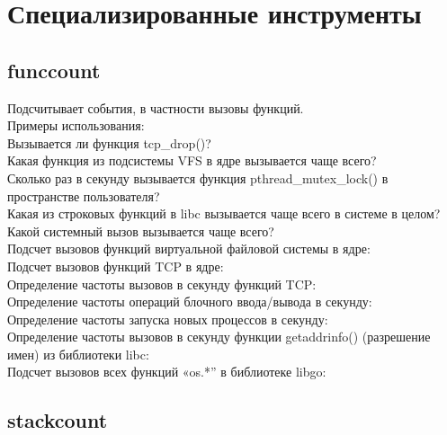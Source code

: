 \section{Специализированные инструменты}

\subsection{funccount}
Подсчитывает события, в частности вызовы функций. \\

\noindent Примеры использования:\\
\noindent Вызывается ли функция tcp\_drop()? \\
\noindent Какая функция из подсистемы VFS в ядре вызывается чаще всего? \\
\noindent Сколько раз в секунду вызывается функция pthread\_mutex\_lock() в пространстве пользователя? \\
\noindent Какая из строковых функций в libc вызывается чаще всего в системе в целом? \\
\noindent Какой системный вызов вызывается чаще всего? \\
\noindent Подсчет вызовов функций виртуальной файловой системы в ядре:\\
\noindent Подсчет вызовов функций TCP в ядре:\\
\noindent Определение частоты вызовов в секунду функций TCP:\\
\noindent Определение частоты операций блочного ввода/вывода в секунду:\\
\noindent Определение частоты запуска новых процессов в секунду:\\
\noindent Определение частоты вызовов в секунду функции getaddrinfo() (разрешение имен)
из библиотеки libc:\\
\noindent Подсчет вызовов всех функций «os.*” в библиотеке libgo:\\

\subsection{stackcount}

